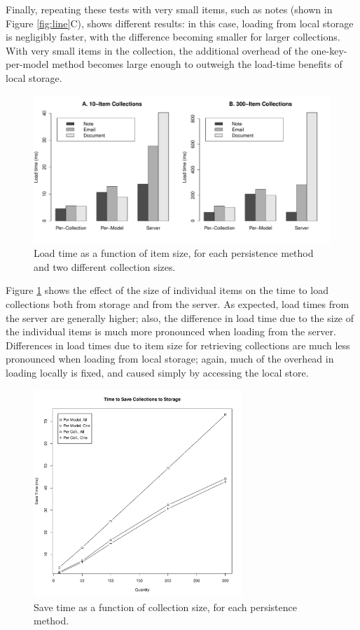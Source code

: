 \documentclass[12pt]{article}
\begin{document}
Finally, repeating these tests with very small items, such as notes (shown in
Figure \ref{fig:line}C), shows different results: in this case, loading from
local storage is negligibly faster, with the difference becoming smaller for
larger collections. With very small items in the collection, the additional
overhead of the one-key-per-model method becomes large enough to outweigh the
load-time benefits of local storage.

\begin{figure}[th]
  \centering
  \includegraphics[width=\textwidth]{bars.pdf}
  \caption{Load time as a function of item size, for each persistence method
  and two different collection sizes.}
  \label{fig:bar}
\end{figure}

Figure \ref{fig:bar} shows the effect of the size of individual items on the
time to load collections both from storage and from the server. As expected,
load times from the server are generally higher; also, the difference in load
time due to the size of the individual items is much more pronounced when
loading from the server. Differences in load times due to item size for
retrieving collections are much less pronounced when loading from local
storage; again, much of the overhead in loading locally is fixed, and caused
simply by accessing the local store.

\begin{figure}[th]
    \centering
    \includegraphics[width=0.7\textwidth]{save.pdf}
    \caption{Save time as a function of collection size, for each persistence
    method.}
    \label{fig:save}
\end{figure}
\end{document}
